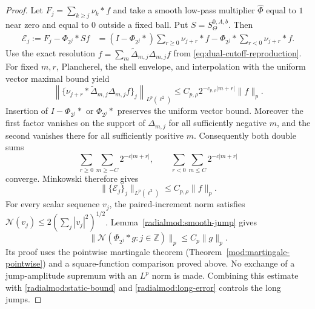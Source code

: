 \documentclass[11pt]{article}
\numberwithin{equation}{section}
\theoremstyle{remark}
\theoremstyle{definition}
\begin{document}
\begin{proof}

Let $F_j=\sum_{k\ge j}\nu_k*f$ and take a smooth low-pass multiplier
$\widehat\Phi$ equal to $1$ near zero and equal to $0$ outside a fixed
ball. Put $S=S^{0,A,b}_\Theta$. Then
\begin{align*}
 \mathcal E_j:=F_j-\Phi_{2^j}*Sf
  &=(I-\Phi_{2^j}*)\sum_{r\ge0}\nu_{j+r}*f
       -\Phi_{2^j}*\sum_{r<0}\nu_{j+r}*f.
\end{align*}
Use the exact resolution
$f=\sum_m\widetilde\Delta_{m,j}\Delta_{m,j}f$ from
\eqref{eq:dual-cutoff-reproduction}. For fixed $m,r$, Plancherel, the shell
envelope, and interpolation with the uniform vector maximal bound yield
\[
 \left\|\{\nu_{j+r}*\widetilde\Delta_{m,j}\Delta_{m,j}f\}_j\right\|_{L^p(\ell^2)}
 \le C_{p,\rho}2^{-c_{p,\rho}|m+r|}\|f\|_p.
\]
Insertion of $I-\Phi_{2^j}*$ or $\Phi_{2^j}*$ preserves the uniform vector
bound. Moreover the first factor vanishes on the support of
$\Delta_{m,j}$ for all sufficiently negative $m$, and the second
vanishes there for all sufficiently positive $m$. Consequently both
double sums
\[
 \sum_{r\ge0}\sum_{m\ge-C}2^{-c|m+r|},
 \qquad
 \sum_{r<0}\sum_{m\le C}2^{-c|m+r|}
\]
converge. Minkowski therefore gives
\begin{equation}\label{radialmod:long-error}
 \|\{\mathcal E_j\}_j\|_{L^p(\ell^2)}\le C_{p,\rho}\|f\|_p.
\end{equation}
For every scalar sequence $v_j$, the paired-increment norm satisfies
$\mathcal N(v_j)\le2(\sum_j|v_j|^2)^{1/2}$. Lemma~\ref{radialmod:smooth-jump} gives
\[
 \|\mathcal N(\Phi_{2^j}*g:j\in\mathbb Z)\|_p\le C_p\|g\|_p.
\]
Its proof uses the pointwise martingale theorem
(Theorem~\ref{mod:martingale-pointwise}) and a square-function comparison
proved above. No exchange of a jump-amplitude supremum with an $L^p$
norm is made. Combining this estimate with
\eqref{radialmod:static-bound} and \eqref{radialmod:long-error} controls
the long jumps.


\end{proof}
\end{document}

